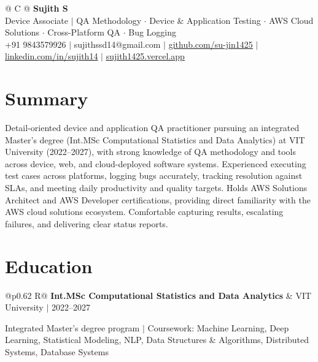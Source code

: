 \documentclass[a4paper,10pt]{article}
\newcommand{\ulink}[2]{\href{#1}{\uline{#2}}}
\newcommand{\subheading}[1]{{\color[HTML]{0A0A0A}\fontsize{12}{14}\selectfont\bfseries #1}}
\newcommand{\meta}[1]{{\color[HTML]{5C5C5C}\fontsize{10.5}{12.5}\selectfont #1}}
\begin{document}
\pagestyle{empty}

\begin{tabularx}{\linewidth}{@{} C @{}}
{\color[HTML]{000000}\fontsize{30}{35}\selectfont\bfseries Sujith S} \\[5pt]
{\fontsize{10.5}{12.5}\selectfont\color[HTML]{3A3A3A}
Device Associate $|$ QA Methodology $\cdot$ Device \& Application Testing $\cdot$ AWS Cloud Solutions $\cdot$ Cross-Platform QA $\cdot$ Bug Logging} \\[6pt]
{\fontsize{10.5}{12.5}\selectfont\textcolor[HTML]{3A3A3A}{
+91 9843579926 $|$
sujithssd14@gmail.com $|$
\ulink{https://github.com/su-jin1425}{github.com/su-jin1425} $|$
\ulink{https://linkedin.com/in/sujith14}{linkedin.com/in/sujith14} $|$
\ulink{https://sujith1425.vercel.app}{sujith1425.vercel.app}}}
\end{tabularx}

\vspace{2pt}

\section{Summary}
\vspace{5pt}
{\color[HTML]{0A0A0A}\fontsize{11}{14}\selectfont
Detail-oriented device and application QA practitioner pursuing an integrated Master's degree (Int.MSc Computational Statistics and Data Analytics) at VIT University (2022--2027), with strong knowledge of QA methodology and tools across device, web, and cloud-deployed software systems. Experienced executing test cases across platforms, logging bugs accurately, tracking resolution against SLAs, and meeting daily productivity and quality targets. Holds AWS Solutions Architect and AWS Developer certifications, providing direct familiarity with the AWS cloud solutions ecosystem. Comfortable capturing results, escalating failures, and delivering clear status reports.}

\vspace{2pt}

\section{Education}
\vspace{2pt}

\begin{tabularx}{\linewidth}{@{}p{0.62\linewidth} R@{}}
\subheading{Int.MSc Computational Statistics and Data Analytics} & \meta{VIT University $|$ 2022--2027}
\end{tabularx}
\vspace{1pt}
{\color[HTML]{3A3A3A}\fontsize{11}{14}\selectfont Integrated Master's degree program $|$ Coursework: Machine Learning, Deep Learning, Statistical Modeling, NLP, Data Structures \& Algorithms, Distributed Systems, Database Systems}
\end{document}
